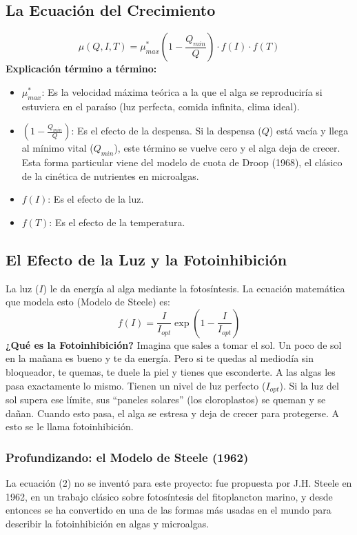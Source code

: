 \documentclass[11pt,a4paper]{article}
\begin{document}
\subsection{La Ecuación del Crecimiento}
\begin{equation}
\mu(Q,I,T) = \mu_{max}^* \left(1 - \frac{Q_{min}}{Q}\right) \cdot f(I) \cdot f(T)
\end{equation}
\textbf{Explicación término a término:}
\begin{itemize}
    \item $\mu_{max}^*$: Es la velocidad máxima teórica a la que el alga se reproduciría si estuviera en el paraíso (luz perfecta, comida infinita, clima ideal).
    \item $\left(1 - \frac{Q_{min}}{Q}\right)$: Es el efecto de la despensa. Si la despensa ($Q$) está vacía y llega al mínimo vital ($Q_{min}$), este término se vuelve cero y el alga deja de crecer. Esta forma particular viene del modelo de cuota de Droop (1968), el clásico de la cinética de nutrientes en microalgas.
    \item $f(I)$: Es el efecto de la luz.
    \item $f(T)$: Es el efecto de la temperatura.
\end{itemize}

\subsection{El Efecto de la Luz y la Fotoinhibición}
La luz ($I$) le da energía al alga mediante la fotosíntesis. La ecuación matemática que modela esto (Modelo de Steele) es:
\begin{equation}
f(I) = \frac{I}{I_{opt}} \exp\left(1 - \frac{I}{I_{opt}}\right)
\end{equation}
\textbf{¿Qué es la Fotoinhibición?} Imagina que sales a tomar el sol. Un poco de sol en la mañana es bueno y te da energía. Pero si te quedas al mediodía sin bloqueador, te quemas, te duele la piel y tienes que esconderte. A las algas les pasa exactamente lo mismo. Tienen un nivel de luz perfecto ($I_{opt}$). Si la luz del sol supera ese límite, sus ``paneles solares'' (los cloroplastos) se queman y se dañan. Cuando esto pasa, el alga se estresa y deja de crecer para protegerse. A esto se le llama fotoinhibición.

\subsubsection{Profundizando: el Modelo de Steele (1962)}
La ecuación (2) no se inventó para este proyecto: fue propuesta por J.H. Steele en 1962, en un trabajo clásico sobre fotosíntesis del fitoplancton marino, y desde entonces se ha convertido en una de las formas más usadas en el mundo para describir la fotoinhibición en algas y microalgas.
\end{document}
